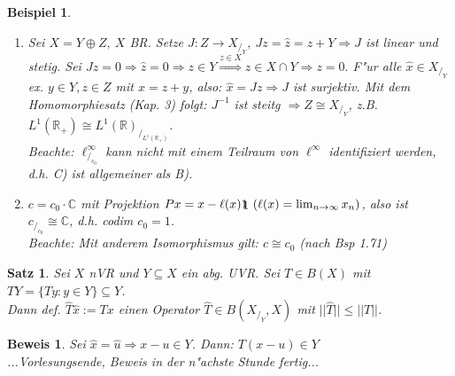 \documentclass[a4paper,11pt]{book}
\newcommand{\R}{{\mathbb R}}
\newcommand{\C}{{\mathbb C}}
\newcommand{\ind}{1\hspace{-0,9ex}\raisebox{-0,2ex}{1}}
\newtheorem{Sa}[Def]{Satz}
\newtheorem{Bsp}[Def]{Beispiel}
\theoremstyle{nonumberplain}
\newtheorem{Bew}[Def]{Beweis}
\begin{document}
\begin{Bsp}
\begin{enumerate}
\item[a)] Sei $X = Y \oplus Z,\ X$ BR. Setze $J: Z \rightarrow X_{/_Y},\ Jz = \hat{z} = z+Y \Rightarrow J$ ist linear und stetig. Sei $Jz = 0 \Rightarrow \hat{z} = 0 \Rightarrow z \in Y \stackrel{z \in X}{\Rightarrow} z \in X \cap Y \Rightarrow z = 0.$ F"ur alle $\hat{x} \in X_{/_Y}$ ex. $y \in Y, z \in Z$ mit $x = z+y$, also: $\hat{x} = Jz \Rightarrow J$ ist surjektiv. Mit dem Homomorphiesatz (Kap. 3) folgt: $J^{-1}$ ist steitg $\Rightarrow Z \cong X_{/_Y}$, z.B. $L^1(\R_+) \cong L^1(\R)_{/_{L^1(\R_+)}}$.\\
Beachte: $\ell_{/_{c_0}}^{\infty}$ kann nicht mit einem Teilraum von $\ell^{\infty}$ identifiziert werden, d.h. C) ist allgemeiner als B).

\item[b)] $c = c_0 \cdot \C$ mit Projektion $Px = x - \ell(x) \ind \ (\ell(x)=\lim_{n \rightarrow \infty} x_n)$, also ist $c_{/_{c_0}} \cong \C$, d.h. codim $c_0 = 1$.\\
Beachte: Mit anderem Isomorphismus gilt: $c \cong c_0$ (nach Bsp 1.71)
\end{enumerate}
\end{Bsp}

\begin{Sa}
Sei $X$ nVR und $Y \subseteq X$ ein abg. UVR. Sei $T \in B(X)$ mit $TY = \{ Ty: y \in Y \} \subseteq Y$.\\
Dann def. $\hat{T} \hat{x} := Tx$ einen Operator $\hat{T} \in B(X_{/_Y},X)$ mit $||\hat{T}|| \leq ||T||$.
\end{Sa}

\begin{Bew}
Sei $\hat{x} = \hat{u} \Rightarrow x-u \in Y$. Dann: $T(x-u) \in Y$\\
...Vorlesungsende, Beweis in der n"achste Stunde fertig...
\end{Bew}
\end{document}
